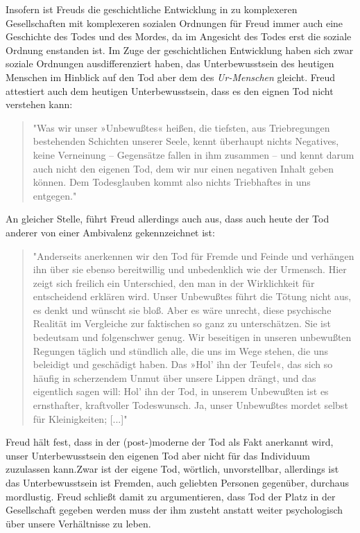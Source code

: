 \documentclass[11pt,a4paper,oneside,numbers=noenddot,bibliography=totocnumbered,DIV=13]{scrartcl}
\begin{document}
{Insofern ist Freuds die geschichtliche Entwicklung in zu komplexeren Gesellschaften mit komplexeren sozialen Ordnungen für Freud immer auch eine Geschichte des Todes und des Mordes, da im Angesicht des Todes erst die soziale Ordnung enstanden ist. Im Zuge der geschichtlichen Entwicklung haben sich zwar soziale Ordnungen ausdifferenziert haben, das Unterbewusstsein des heutigen Menschen im Hinblick auf den Tod aber dem des \textit{Ur-Menschen} gleicht. Freud attestiert auch dem heutigen Unterbewusstsein, dass es den eignen Tod nicht verstehen kann:
\begin{quote}
"Was wir unser »Unbewußtes« heißen, die tiefsten, aus Triebregungen bestehenden Schichten unserer Seele, kennt überhaupt nichts Negatives, keine Verneinung – Gegensätze fallen in ihm zusammen – und kennt darum auch nicht den eigenen Tod, dem wir nur einen negativen Inhalt geben können. Dem Todesglauben kommt also nichts Triebhaftes in uns entgegen." 
\end{quote}
 An gleicher Stelle, führt Freud allerdings auch aus, dass auch heute der Tod anderer von einer Ambivalenz gekennzeichnet ist:
 \begin{quote}
 "Anderseits anerkennen wir den Tod für Fremde und Feinde und verhängen ihn über sie ebenso bereitwillig und unbedenklich wie der Urmensch. Hier zeigt sich freilich ein Unterschied, den man in der Wirklichkeit für entscheidend erklären wird. Unser Unbewußtes führt die Tötung nicht aus, es denkt und wünscht sie bloß. Aber es wäre unrecht, diese psychische Realität im Vergleiche zur faktischen so ganz zu unterschätzen. Sie ist bedeutsam und folgenschwer genug. Wir beseitigen in unseren unbewußten Regungen täglich und stündlich alle, die uns im Wege stehen, die uns beleidigt und geschädigt haben. Das »Hol' ihn der Teufel«, das sich so häufig in scherzendem Unmut über unsere Lippen drängt, und das eigentlich sagen will: Hol' ihn der Tod, in unserem Unbewußten ist es ernsthafter, kraftvoller Todeswunsch. Ja, unser Unbewußtes mordet selbst für Kleinigkeiten; [...]" 
 \end{quote}
 Freud hält fest, dass in der (post-)moderne der Tod als Fakt anerkannt wird, unser Unterbewusstsein den eigenen Tod aber nicht für das Individuum zuzulassen kann.Zwar ist der eigene Tod, wörtlich, unvorstellbar, allerdings ist das Unterbewusstsein ist Fremden, auch geliebten Personen gegenüber, durchaus mordlustig. Freud schließt damit zu argumentieren, dass Tod der Platz in der Gesellschaft gegeben werden muss der ihm zusteht anstatt weiter psychologisch über unsere Verhältnisse zu leben.
}
\end{document}
